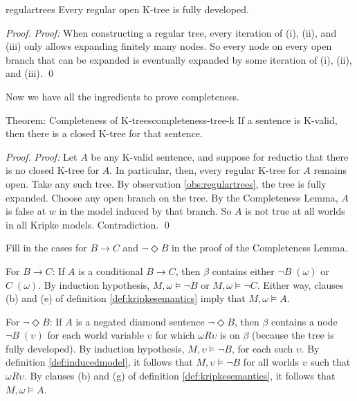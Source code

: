 \begin{observation}{regulartrees}
  Every regular open K-tree is fully developed.
\end{observation}
\begin{proof}
  \emph{Proof:} When constructing a regular tree, every iteration of (i), (ii),
  and (iii) only allows expanding finitely many nodes. So every node on every
  open branch that can be expanded is eventually expanded by some iteration of
  (i), (ii), and (iii). \qed
\end{proof}

Now we have all the ingredients to prove completeness.

\begin{theorem}{Theorem: Completeness of K-trees}{completeness-tree-k}
  If a sentence is K-valid, then there is a closed K-tree for that sentence.
\end{theorem}

\begin{proof}
  \emph{Proof:} Let $A$ be any K-valid sentence, and suppose for reductio that
  there is no closed K-tree for $A$. In particular, then, every regular K-tree
  for $A$ remains open. Take any such tree. By observation
  \ref{obs:regulartrees}, the tree is fully expanded. Choose any open branch on
  the tree. By the Completeness Lemma, $A$ is false at $w$ in the model induced
  by that branch. So $A$ is not true at all worlds in all Kripke models.
  Contradiction. \qed
\end{proof}

\begin{exercise}
  Fill in the cases for $B \to C$ and $\neg \Diamond B$ in the proof of the
  Completeness Lemma.
\end{exercise}
\begin{solution}
  For $B\to C$: If $A$ is a conditional $B\to C$, then $\beta$ contains either
  $\neg B \;(\omega)$ or $C \;(\omega)$. By induction hypothesis,
  $M,\omega \models \neg B$ or $M,\omega \models \neg C$. Either way, clauses
  (b) and (e) of definition \ref{def:kripkesemantics} imply that
  $M,\omega \models A$.

  For $\neg\Diamond B$: If $A$ is a negated diamond sentence $\neg\Diamond B$,
  then $\beta$ contains a node $\neg B \;(\upsilon)$ for each world variable
  $\upsilon$ for which $\omega R \upsilon$ is on $\beta$ (because the tree is
  fully developed). By induction hypothesis, $M, \upsilon \models \neg B$, for
  each such $\upsilon$. By definition \ref{def:inducedmodel}, it follows that
  $M,\upsilon \models \neg B$ for all worlds $\upsilon$ such that
  $\omega R \upsilon$. By clauses (b) and (g) of definition
  \ref{def:kripkesemantics}, it follows that $M, \omega \models A$.
\end{solution}

